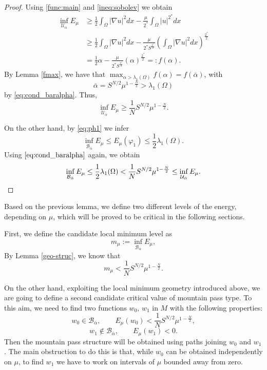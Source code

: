 \documentclass[10pt]{article}
\newcommand{\Bcal}{{\mathcal{B}}}
\theoremstyle{definition}
\numberwithin{equation}{section}
\begin{document}
\begin{proof}
Using \eqref{func:main} and \eqref{ineq:sobolev} we obtain
\begin{equation*}
\begin{aligned}\displaystyle
\inf\limits_{\mathcal{U}_{\alpha}} E_{\mu}&\geq \frac{1}{2}\int_{\Omega}|\nabla u|^{2}dx-\frac{\mu}{2^{*}}\int_{\Omega}|u|^{2^{*}}dx\\
&\geq \frac{1}{2}\int_{\Omega}|\nabla u|^{2}dx-\frac{\mu}{2^{*}S^{\frac{2^{*}}{2}}}(\int_{\Omega}|\nabla u|^{2}dx)^{\frac{2^{*}}{2}}\\
&= \frac{1}{2}\alpha -\frac{\mu}{2^{*}S^{\frac{2^{*}}{2}}}(\alpha)^{\frac{2^{*}}{2}}=:f(\alpha).
\end{aligned}
\end{equation*}
By Lemma \ref{fmax}, we have that $\max_{\alpha>\lambda_1(\Omega)} f(\alpha) = f (\bar\alpha)$, with
\[
\bar{\alpha}=S^{N/2}\mu^{1-\frac{N}{2}}>\lambda_1(\Omega)
\]
by \eqref{eq:cond_baralpha}. Thus,
\[\inf\limits_{\mathcal{U}_{\bar\alpha}} E_{\mu}\geq \frac{1}{N}S^{N/2}\mu^{1-\frac{N}{2}}.\]

On the other hand, by \eqref{eq:ph1} we infer
\[\inf\limits_{\mathcal{B}_{\bar\alpha}} E_{\mu}\leq E_{\mu}(\varphi_{1})\leq\frac{1}{2}\lambda_{1}(\Omega).\]
Using $\eqref{eq:cond_baralpha}$ again, we obtain
\[
\inf\limits_{\mathcal{B}_{\bar\alpha}} E_{\mu}\leq\frac{1}{2}\lambda_{1}(\Omega)<\frac{1}{N}S^{N/2}\mu^{1-\frac{N}{2}}\leq\inf\limits_{\mathcal{U}_{\bar\alpha}} E_{\mu}.
\qedhere
\]
\end{proof}

Based on the previous lemma, we define two different levels of the energy, depending on
$\mu$, which will be proved to be critical in the following sections.

First, we define the candidate local minimum level as
\begin{equation}\label{eq:minimumlevel}
m_{\mu}:=\inf\limits_{\mathcal{B}_{\bar\alpha}}E_{\mu},
\end{equation}
By Lemma \ref{geo-struc}, we know that
\begin{equation}\label{level:min}
m_{\mu}<\frac{1}{N}S^{N/2}\mu^{1-\frac{N}{2}}.
\end{equation}

On the other hand, exploiting the local minimum geometry introduced above, we are going to
define a second candidate critical value of mountain pass type.
To this aim, we need to find two functions $w_0$, $w_1$ in $M$ with the following properties:
\begin{equation}\label{eq:w0_inside}
w_0\in \Bcal_{\bar \alpha},\qquad E_\mu(w_0) < \frac{1}{N}S^{N/2}\mu^{1-\frac{N}{2}},
\end{equation}
\begin{equation}\label{eq:w1_outside}
w_1\not\in \Bcal_{\bar \alpha},\qquad E_\mu(w_1) < 0.
\end{equation}
Then the mountain pass structure will be obtained using paths joining $w_0$ and $w_1$. The
main obstruction to do this is that, while $w_0$ can be obtained independently on $\mu$, to
find $w_1$ we have to work on intervals of $\mu$ bounded away from zero.
\end{document}
